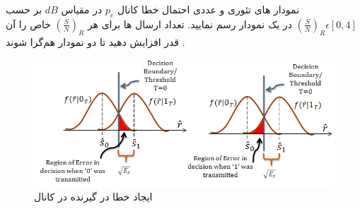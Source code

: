 \documentclass[14pt, professionalfont]{article}
\begin{document}
\begin{enumerate}
	نمودار های تئوری و عددی احتمال خطا کانال 
	\:
	$p_e$
	\:
	در مقیاس 
	\:
	$dB$
	\:
	بر حسب 
	\:
		$\left(\frac{S}{N}\right)_R \epsilon [0,4]$
	\:
	در یک نمودار رسم نمایید. تعداد ارسال ها برای هر
	\:
	$\left(\frac{S}{N}\right)_R$
	\:
	خاص را آن قدر افزایش دهید تا دو نمودار هم‌گرا شوند .
		\begin{figure}[H]
		\centering
		\includegraphics[scale = 0.35]{../images/error.png}
		\caption{
			ایجاد خطا در گیرنده در کانال
			\:
		}
	\end{figure}
	
	\end{enumerate}
\end{document}
